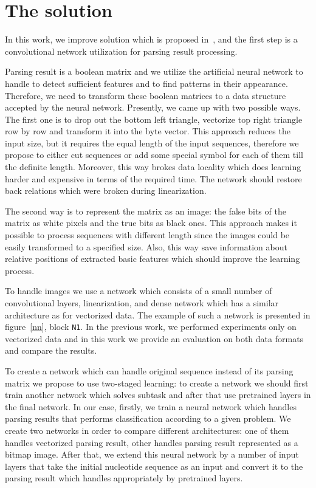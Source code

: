 \documentclass[12pt,a4paper]{cibb}
\begin{document}
\section{\bf The solution}

In this work, we improve solution which is proposed in~\cite{grigorevcomposition}, and the first step is a convolutional network utilization for parsing result processing.

Parsing result is a boolean matrix and we utilize the artificial neural network to handle to detect sufficient features and to find patterns in their appearance.
Therefore, we need to transform these boolean matrices to a data structure accepted by the neural network.
Presently, we came up with two possible ways.
The first one is to drop out the bottom left triangle, vectorize top right triangle row by row and transform it into the byte vector.
This approach reduces the input size, but it requires the equal length of the input sequences, therefore we propose to either cut sequences or add some special symbol for each of them till the definite length.
Moreover, this way brokes data locality which does learning harder and expensive in terms of the required time.
The network should restore back relations which were broken during linearization.

The second way is to represent the matrix as an image: the false bits of the matrix as white pixels and the true bits as black ones.
This approach makes it possible to process sequences with different length since the images could be easily transformed to a specified size.
Also, this way save information about relative positions of extracted basic features which should improve the learning process.

To handle images we use a network which consists of a small number of convolutional layers, linearization, and dense network which has a similar architecture as for vectorized data.
The example of such a network is presented in figure~\ref{nn}, block \texttt{N1}.
In the previous work, we performed experiments only on vectorized data and in this work we provide an evaluation on both data formats and compare the results.

To create a network which can handle original sequence instead of its parsing matrix we propose to use two-staged learning: to create a network we should first train another network which solves subtask and after that use pretrained layers in the final network.
In our case, firstly, we train a neural network which handles parsing results that performs classification according to a given problem.
We create two networks in order to compare different architectures: one of them handles vectorized parsing result, other handles parsing result represented as a bitmap image.
After that, we extend this neural network by a number of input layers that take the initial nucleotide sequence as an input and convert it to the parsing result which handles appropriately by pretrained layers.
\end{document}
